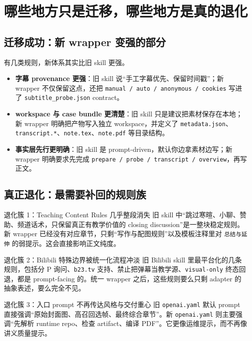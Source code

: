 \documentclass[a4paper]{article}
\begin{document}
\section{哪些地方只是迁移，哪些地方是真的退化}

\subsection{迁移成功：新 wrapper 变强的部分}

有几类规则，新体系其实比旧 skill 更强。

\begin{itemize}
\item \textbf{字幕 provenance 更强}：旧 skill 说“手工字幕优先、保留时间戳”；新 wrapper 不仅保留这点，还把 \texttt{manual / auto / anonymous / cookies} 写进了 \texttt{subtitle\_probe.json} contract。
\item \textbf{workspace 与 case bundle 更清楚}：旧 skill 只是建议把素材保存在本地；新 wrapper 明确把产物写入独立 workspace，并定义了 \texttt{metadata.json}、\texttt{transcript.*}、\texttt{note.tex}、\texttt{note.pdf} 等目录结构。
\item \textbf{事实层先行更明确}：旧 skill 是 prompt-driven，默认你边拿素材边写；新 wrapper 明确要求先完成 \texttt{prepare / probe / transcript / overview}，再写正文。
\end{itemize}

\subsection{真正退化：最需要补回的规则族}

\begin{riskbox}{退化簇 1：Teaching Content Rules 几乎整段消失}
旧 skill 中“跳过寒暄、小聊、赞助、频道话术，只保留真正有教学价值的 closing discussion”是一整块稳定规则。新 wrapper 已经没有对应章节，只剩“写作与配图规则”以及模板注释里对 \texttt{总结与延伸} 的弱提示。这会直接影响正文纯度。
\end{riskbox}

\begin{riskbox}{退化簇 2：Bilibili 特殊边界被统一化流程冲淡}
旧 Bilibili skill 里最平台化的几条规则，包括分 P 询问、\texttt{b23.tv} 支持、禁止把弹幕当教学源、\texttt{visual-only} 终态回退，都是 prompt-facing 的。统一 wrapper 之后，这些规则要么只剩 adapter 的抽象表述，要么完全不见。
\end{riskbox}

\begin{riskbox}{退化簇 3：入口 prompt 不再传达风格与交付重心}
旧 \texttt{openai.yaml} 默认 prompt 直接强调“原始封面图、高召回选帧、最终综合章节”。新 \texttt{openai.yaml} 则主要强调“先解析 runtime repo、检查 artifact、编译 PDF”。它更像运维提示，而不再像讲义质量提示。
\end{riskbox}
\end{document}
